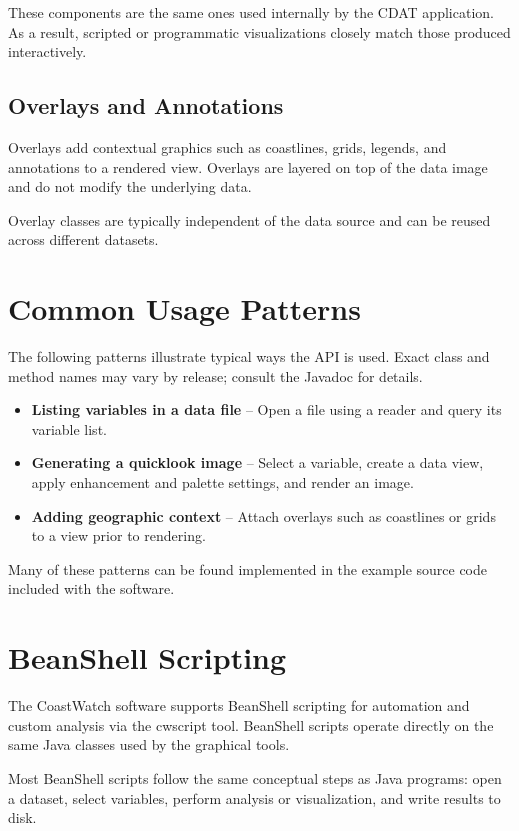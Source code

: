 These components are the same ones used internally by the CDAT
application. As a result, scripted or programmatic visualizations
closely match those produced interactively.

\subsection{Overlays and Annotations}

Overlays add contextual graphics such as coastlines, grids, legends,
and annotations to a rendered view. Overlays are layered on top of the
data image and do not modify the underlying data.

Overlay classes are typically independent of the data source and can
be reused across different datasets.

\section{Common Usage Patterns}

The following patterns illustrate typical ways the API is used. Exact
class and method names may vary by release; consult the Javadoc for
details.

\begin{itemize}
  \item \textbf{Listing variables in a data file} --
        Open a file using a reader and query its variable list.
  \item \textbf{Generating a quicklook image} --
        Select a variable, create a data view, apply enhancement and
        palette settings, and render an image.
  \item \textbf{Adding geographic context} --
        Attach overlays such as coastlines or grids to a view prior
        to rendering.
\end{itemize}

Many of these patterns can be found implemented in the example source
code included with the software.

\section{BeanShell Scripting}

The CoastWatch software supports BeanShell scripting for automation and
custom analysis via the cwscript tool. BeanShell scripts operate directly on the same Java
classes used by the graphical tools.

Most BeanShell scripts follow the same conceptual steps as Java programs:
open a dataset, select variables, perform analysis or visualization,
and write results to disk.

